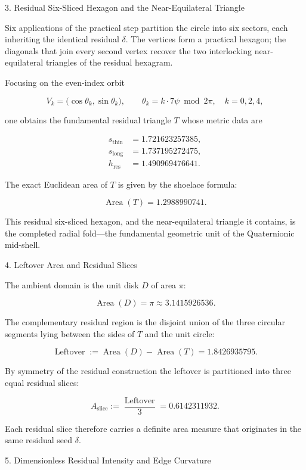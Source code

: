 3. Residual Six-Sliced Hexagon and the Near-Equilateral Triangle

Six applications of the practical step partition the circle into six sectors, each inheriting the identical residual \(\delta\). The vertices form a practical hexagon; the diagonals that join every second vertex recover the two interlocking near-equilateral triangles of the residual hexagram.

Focusing on the even-index orbit

\[
V_k = \bigl(\cos\theta_k,\sin\theta_k\bigr),\qquad
\theta_k = k\cdot 7\psi\bmod 2\pi,\quad k=0,2,4,
\]

one obtains the fundamental residual triangle \(T\) whose metric data are

\[
\begin{align*}
s_{\mathrm{thin}} &= 1.721623257385,\\
s_{\mathrm{long}} &= 1.737195272475,\\
h_{\mathrm{res}}  &= 1.490969476641.
\end{align*}
\]

The exact Euclidean area of \(T\) is given by the shoelace formula:

\[
\operatorname{Area}(T) = 1.2988990741.
\]

This residual six-sliced hexagon, and the near-equilateral triangle it contains, is the completed radial fold—the fundamental geometric unit of the Quaternionic mid-shell.

4. Leftover Area and Residual Slices

The ambient domain is the unit disk \(D\) of area \(\pi\):

\[
\operatorname{Area}(D)=\pi\approx 3.1415926536.
\]

The complementary residual region is the disjoint union of the three circular segments lying between the sides of \(T\) and the unit circle:

\[
\operatorname{Leftover} := \operatorname{Area}(D)-\operatorname{Area}(T)
= 1.8426935795.
\]

By symmetry of the residual construction the leftover is partitioned into three equal residual slices:

\[
A_{\mathrm{slice}} := \frac{\operatorname{Leftover}}{3} = 0.6142311932.
\]

Each residual slice therefore carries a definite area measure that originates in the same residual seed \(\delta\).

5. Dimensionless Residual Intensity and Edge Curvature


